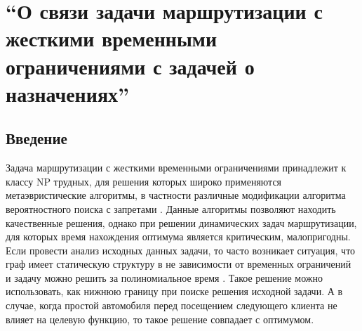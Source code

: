\documentclass[]{TAACpaper}
\begin{document}

\def\dd#1#2{\frac{\partial#1}{\partial#2}}
\section{
``О связи задачи маршрутизации с жесткими временными ограничениями с задачей о назначениях'' 
}



\subsection{Введение}
Задача маршрутизации с жесткими временными ограничениями принадлежит к классу NP трудных\cite{VRPTW}, для решения которых широко применяются метаэвристические алгоритмы, в частности различные модификации алгоритма вероятностного поиска с запретами \cite{Tabu_search}. Данные алгоритмы позволяют находить качественные решения, однако при решении динамических задач маршрутизации, для которых время нахождения оптимума является критическим, малопригодны. Если  провести анализ исходных данных задачи, то часто  возникает ситуация, что граф имеет статическую структуру в не зависимости от временных ограничений и задачу можно решить за полиномиальное время \cite{Assignment_Problems}. Такое решение можно использовать, как нижнюю границу при поиске решения исходной задачи. А в случае, когда простой автомобиля перед посещением следующего клиента не влияет на целевую функцию, то такое решение совпадает с оптимумом.  
\end{document}
